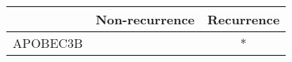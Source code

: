 \begin{tabular}{lcc}
\toprule
{} & Non-recurrence & Recurrence \\
\midrule
APOBEC3B &                &          * \\
\bottomrule
\end{tabular}
